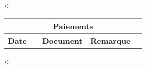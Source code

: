  \vspace{0.5cm}
 
 <%
\begin{tabular}{@{}llllr@{}}
  \multicolumn{5}{c}{\textbf{Paiements}} \\
  \hline
  \textbf{Date} & & \textbf{Document} & \textbf{Remarque} & \textbf{Montant <%
  \hline
<%
<%
  <%
<%
<%
\hline
\end{tabular}
<%